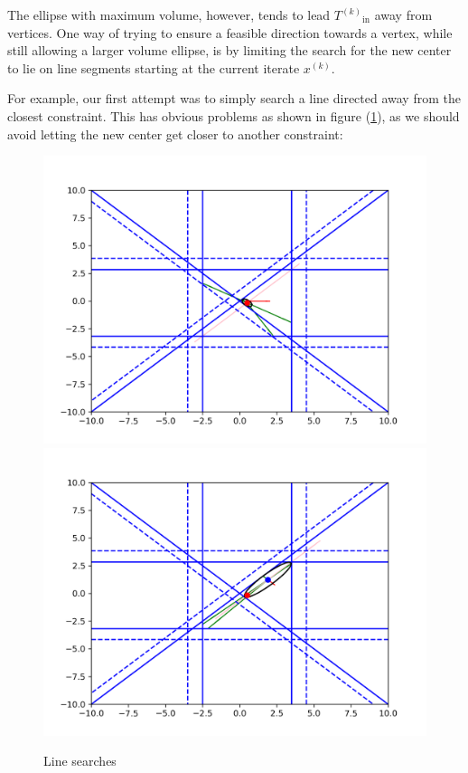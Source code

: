 \documentclass{article}
\theoremstyle{case}
\newcommand{\iteratek}{{x}^{(k)}}
\newcommand{\innertrk}{{T^{(k)}}_{\text{in}}}
\let\oldref\ref
\renewcommand{\ref}[1]{(\oldref{#1})}
\begin{document}
The ellipse with maximum volume, however, tends to lead $\innertrk$ away from vertices.
One way of trying to ensure a feasible direction towards a vertex, while still allowing a larger volume ellipse, is by limiting the search for the new center to lie on line segments starting at the current iterate $\iteratek$.

For example, our first attempt was to simply search a line directed away from the closest constraint.
This has obvious problems as shown in figure \ref{first_line_search}, as we should avoid letting the new center get closer to another constraint:

\begin{figure}[h]
    \centering
    \includegraphics[scale=0.4]{images/line_1.png}
    \includegraphics[scale=0.4]{images/line_2.png}
    \caption{Line searches}
    \label{first_line_search}
\end{figure}
\end{document}
